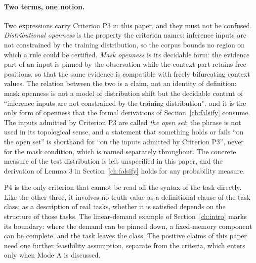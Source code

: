 \paragraph{Two terms, one notion.} Two expressions carry Criterion P3 in this paper, and they must not be confused. \emph{Distributional openness} is the property the criterion names: inference inputs are not constrained by the training distribution, so the corpus bounds no region on which a rule could be certified. \emph{Mask openness} is its decidable form: the evidence part of an input is pinned by the observation while the context part retains free positions, so that the same evidence is compatible with freely bifurcating context values. The relation between the two is a claim, not an identity of definition: mask openness is not a model of distribution shift but the decidable content of ``inference inputs are not constrained by the training distribution'', and it is the only form of openness that the formal derivations of Section~\ref{ch:falsify} consume. The inputs admitted by Criterion P3 are called \emph{the open set}; the phrase is not used in its topological sense, and a statement that something holds or fails ``on the open set'' is shorthand for ``on the inputs admitted by Criterion P3'', never for the mask condition, which is named separately throughout. The concrete measure of the test distribution is left unspecified in this paper, and the derivation of Lemma 3 in Section~\ref{ch:falsify} holds for any probability measure.

P4 is the only criterion that cannot be read off the syntax of the task directly. Like the other three, it involves no truth value as a definitional clause of the task class; as a description of real tasks, whether it is satisfied depends on the structure of those tasks. The linear-demand example of Section~\ref{ch:intro} marks its boundary: where the demand can be pinned down, a fixed-memory component can be complete, and the task leaves the class. The positive claims of this paper need one further feasibility assumption, separate from the criteria, which enters only when Mode A is discussed.

